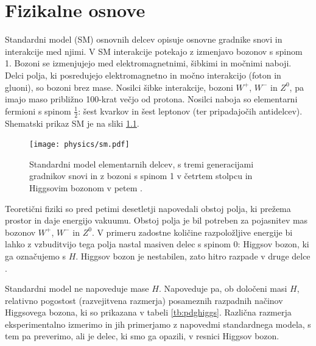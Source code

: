 \documentclass[11pt,a4paper,openany]{book}
\begin{document}
\chapter{Fizikalne osnove}
\label{ch:basics}
Standardni model (SM) osnovnih delcev opisuje osnovne gradnike snovi in interakcije med njimi. V SM interakcije potekajo z izmenjavo bozonov s spinom 1. Bozoni se izmenjujejo med elektromagnetnimi, šibkimi in močnimi naboji. Delci polja, ki posredujejo elektromagnetno in močno interakcijo (foton in gluoni), so bozoni brez mase. Nosilci šibke interakcije, bozoni $W^+$, $W^-$ in $Z^0$, pa imajo maso približno 100-krat večjo od protona. Nosilci naboja so elementarni fermioni s spinom $\frac{1}{2}$: šest kvarkov in šest leptonov (ter pripadajočih antidelcev). Shematski prikaz SM je na sliki \ref{sl:sm}.

\begin{figure}[ht]
	\centering
	\texttt{[image: physics/sm.pdf]}
	
	\caption{ Standardni model elementarnih delcev, s tremi generacijami gradnikov snovi in z bozoni s spinom 1 v četrtem stolpcu in Higgsovim bozonom v petem \cite{WikiSM}. }
	\label{sl:sm}
\end{figure}

Teoretični fiziki so pred petimi desetletji napovedali obstoj polja, ki prežema prostor in daje energijo vakuumu. Obstoj polja je bil potreben za pojasnitev mas bozonov $W^+$, $W^-$ in $Z^0$. V primeru zadostne količine razpoložljive energije bi lahko z vzbuditvijo tega polja nastal masiven delec s spinom 0: Higgsov bozon, ki ga označujemo s $H$. Higgsov bozon je nestabilen, zato hitro razpade v druge delce \cite{AadScience2012, ChallengeDoc}. 

Standardni model ne napoveduje mase $H$. Napoveduje pa, ob določeni masi $H$, relativno pogostost (razvejitvena razmerja) posameznih razpadnih načinov Higgsovega bozona, ki so prikazana v tabeli \ref{tb:pdghiggs}. Različna razmerja eksperimentalno izmerimo in jih primerjamo z napovedmi standardnega modela, s tem pa preverimo, ali je delec, ki smo ga opazili, v resnici Higgsov bozon.
\end{document}
